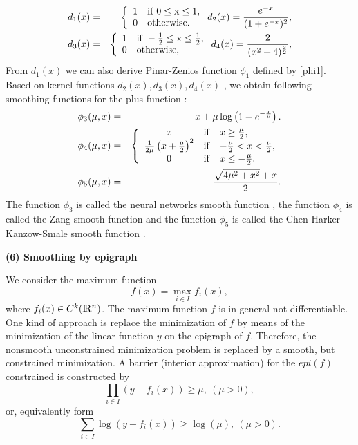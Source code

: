 \documentclass[12pt]{article}
\renewcommand{\Re}{{\rm I}\! {\rm R}}
\newcommand{\rn}{\Re^n}
\begin{document}
  \begin{eqnarray*}
   d_1(x) & =&
 \left\{
 \begin{array}{clc}
 1 & \rm{if} \; 0\leq x \leq 1,\\
 0 & \rm{otherwise}.
 \end{array}
 \right.
 d_2(x) = \frac{e^{-x}}{(1+e^{-x})^2},  \\
 d_3(x) & =&
 \left\{
 \begin{array}{clc}
 1 & \rm{if} \; -\frac{1}{2}\leq x \leq \frac{1}{2},\\
 0 & \rm{otherwise},
 \end{array}
 \right.
 d_4(x) = \frac{2}{(x^2 + 4)^{\frac{3}{2}}}, \\
 \end{eqnarray*}
  From  $d_1(x)$  we can also derive  Pinar-Zenios function $\phi_1$ defined by \eqref{phi1}.
 Based on kernel functions $d_2(x), d_3(x), d_4(x)$ , we obtain following  smoothing functions for the plus function \cite{CM96, QD02}:
 \begin{eqnarray}
  {\phi}_3(\mu, x) &=& x + \mu
 \log \begin{pmatrix}
 1 + e^{-\frac{x}{\mu}} \\
 \end{pmatrix}. \label{phi3} \\
 {\phi}_4(\mu, x) &=&
 \left\{
 \begin{array}{cll}
 x & {\rm if} & x \geq \frac{\mu}{2}, \\
 \frac{1}{2\mu}\left(x + \frac{\mu}{2}\right)^2 & {\rm if} & -\frac{\mu}{2} < x < \frac{\mu}{2}, \\
 0 & {\rm if} & x\leq -\frac{\mu}{2}.
 \end{array}
 \right. \label{phi4} \\
  {\phi}_5(\mu, x) &=& \frac{\sqrt{4\mu^2 + x^2} + x}{2}. \label{phi5}
 \end{eqnarray}
The function $\phi_3$  is called the neural networks smooth function \cite{CM96} ,
the function $\phi_4$  is called the Zang smooth function \cite{CM96,Zang1980} and
the function $\phi_5$  is called the Chen-Harker-Kanzow-Smale smooth function \cite{CM96, CH1993}.

\noindent
 {\bf (6) Smoothing by epigraph}

 \medskip

We consider the  maximum function
\[
 f(x) = \max_{i \in I}f_i(x),
\]
where $f_i(x)\in C^k(\rn)$. The maximum function $f$ is in general not differentiable.
One kind of approach is  replace the minimization of $f $ by means of the minimization
of the linear function $y$ on the epigraph of $f$. Therefore, the nonsmooth unconstrained
minimization problem is replaced by a smooth, but constrained minimization. A barrier
(interior approximation) for the $epi(f)$ constrained is constructed by
\[
\prod_{i\in I}\left ( y - f_i(x)\right ) \geq \mu, \ (\mu > 0),
\]
or, equivalently form
\[
\sum_{i\in I}\log \left ( y - f_i(x)\right ) \geq \log(\mu), \ (\mu > 0).
\]
\end{document}
